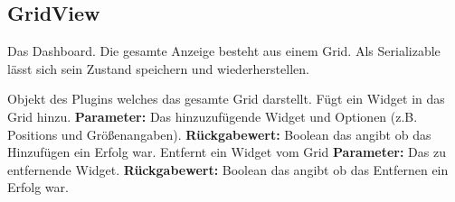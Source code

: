 \documentclass[entwurf.tex]{subfiles}
\begin{document}
		
		\subsection{GridView}
		\label{Class:GridView}
		Das Dashboard. Die gesamte Anzeige besteht aus einem Grid. Als Serializable lässt sich sein Zustand speichern und wiederherstellen.
		\begin{description}
				Objekt des Plugins welches das gesamte Grid darstellt. 
				Fügt ein Widget in das Grid hinzu.
				\textbf{Parameter:} Das hinzuzufügende Widget und Optionen (z.B. Positions und Größenangaben).
				\textbf{Rückgabewert:} Boolean das angibt ob das Hinzufügen ein Erfolg war.
				Entfernt ein Widget vom Grid
				\textbf{Parameter:} Das zu entfernende Widget.
				\textbf{Rückgabewert:} Boolean das angibt ob das Entfernen ein Erfolg war.
		\end{description}
		
\end{document}
